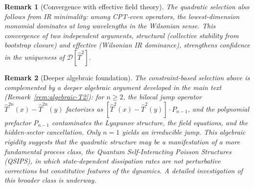 \documentclass[12pt,a4paper]{article}
\newtheorem{remark}{Remark}[section]
\numberwithin{equation}{section}
\begin{document}
\begin{remark}[Convergence with effective field theory]
The quadratic selection also follows from IR minimality: among CPT-even operators, the lowest-dimension monomial dominates at long wavelengths in the Wilsonian sense. This convergence of two independent arguments, structural (collective stability from bootstrap closure) and effective (Wilsonian IR dominance), strengthens confidence in the uniqueness of $\mathcal{D}[\hat T^2]$.
\end{remark}

\begin{remark}[Deeper algebraic foundation]
The constraint-based selection above is complemented by a deeper algebraic argument developed in the main text (Remark~\ref{rem:algebraic-T2}): for $n \ge 2$, the bilocal jump operator $\hat T^{2n}(x) - \hat T^{2n}(y)$ factorizes as $[\hat T^2(x) - \hat T^2(y)] \cdot P_{n-1}$, and the polynomial prefactor $P_{n-1}$ contaminates the Lyapunov structure, the field equations, and the hidden-sector cancellation. Only $n = 1$ yields an \emph{irreducible} jump. This algebraic rigidity suggests that the quadratic structure may be a manifestation of a more fundamental process class, the Quantum Self-Interacting Poisson Structures (QSIPS), in which state-dependent dissipation rates are not perturbative corrections but constitutive features of the dynamics. A detailed investigation of this broader class is underway.
\end{remark}

\endgroup
\end{document}
